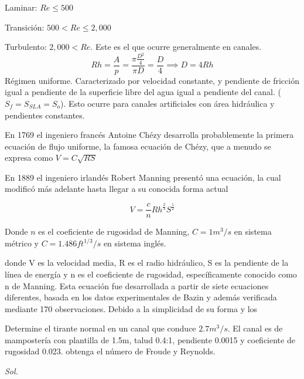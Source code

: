 Laminar: $Re\leq 500$

Transición: $500<Re\leq 2,000$

Turbulento: $2,000<Re$. Este es el que ocurre generalmente en canales.
\begin{equation}
    Rh = \frac{A}{p} = \frac{\pi \frac{D^2}{4}}{\pi D} = \frac{D}{4}\implies D = 4Rh
\end{equation}
Régimen uniforme. Caracterizado por velocidad constante, y pendiente de fricción igual a pendiente de la superficie libre del agua igual a pendiente del canal. ($S_f=S_{SLA}=S_o$). Esto ocurre para canales artificiales con área hidráulica y pendientes constantes.

En 1769 el ingeniero francés Antoine Chézy desarrolla probablemente la primera ecuación de flujo uniforme, la famosa ecuación de Chézy, que a menudo se expresa como $V=C\sqrt{RS}$

En 1889 el ingeniero irlandés Robert Manning presentó una ecuación, la cual modificó más adelante hasta llegar a su conocida forma actual

\begin{equation}
    V = \frac{c}{n}Rh^{\frac{2}{3}}S^{\frac{1}{2}}
\end{equation}

Donde $n$ es el coeficiente de rugosidad de Manning, $C=1 m^3/s$ en sistema métrico y $C=1.486 ft^{1/3}/s$ en sistema inglés. 

donde V es la velocidad media, R es el radio hidráulico, S es la pendiente de la línea de energía y n es el coeficiente de rugosidad, específicamente conocido como n de Manning. Esta ecuación fue desarrollada a partir de siete ecuaciones diferentes, basada en los datos experimentales de Bazin y además verificada mediante 170 observaciones. Debido a la simplicidad de su forma y los

\begin{example}
    Determine el tirante normal en un canal que conduce $2.7m^3/s$. El canal es de mampostería con plantilla de 1.5m, talud 0.4:1, pendiente 0.0015 y coeficiente de rugosidad 0.023. obtenga el número de Froude y Reynolds.
\end{example}
\textit{ Sol. }


